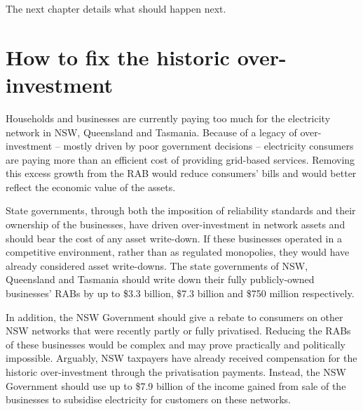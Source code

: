\documentclass[FrontPage]{grattan}
\begin{document}
The next chapter details what should happen next.



\chapter{How to fix the historic over-investment}\label{chap:looking-back-write-down}
Households and businesses are currently paying too much for the electricity network in NSW, Queensland and Tasmania. Because of a legacy of over-investment -- mostly driven by poor government decisions -- electricity consumers are paying more than an efficient cost of providing grid-based services. Removing this excess growth from the RAB would reduce consumers' bills and would better reflect the economic value of the assets.

State governments, through both the imposition of reliability standards and their ownership of the businesses, have driven over-investment in network assets and should bear the cost of any asset write-down. If these businesses operated in a competitive environment, rather than as regulated monopolies, they would have already considered asset write-downs. The state governments of NSW, Queensland and Tasmania should write down their fully publicly-owned businesses' RABs by up to \$3.3 billion, \$7.3 billion and \$750 million respectively. 

In addition, the NSW Government should give a rebate to consumers on other NSW networks that were recently partly or fully privatised. Reducing the RABs of these businesses would be complex and may prove practically and politically impossible. Arguably, NSW taxpayers have already received compensation for the historic over-investment through the privatisation payments. Instead, the NSW Government should use up to \$7.9 billion of the income gained from sale of the businesses to subsidise electricity for customers on these networks. 
\end{document}
